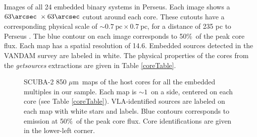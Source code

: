 \documentclass[usenatbib,a4paper]{mnras}
\newcommand{\um}{\mbox{$\mu$m}}%
\begin{document}
Images of all 24 embedded binary systems in Perseus.  Each image shows a $63\arcsec\ \times 63\arcsec$ cutout around each core.  These cutouts have a  corresponding physical scale of $\sim 0.7\ \mbox{pc} \times 0.7\ \mbox{pc}$, for a distance of 235 pc to Perseus \citep{Hirota08}.  The blue contour on each image corresponds to 50\%\ of the peak core flux.  Each map has a spatial resolution of 14.6\arcsec.  Embedded sources detected in the VANDAM survey \citep{Tobin16} are labeled in white.  The physical properties of the cores from the \emph{getsources} extractions are given in Table \ref{coreTable}.

\onecolumn

\renewcommand\thefigure{\thesection.\arabic{figure}}
\setcounter{figure}{0}

\begin{figure}
\centering
{}
\quad
{}
\quad
\caption{SCUBA-2 850 \um\ maps of the host cores for all the embedded multiples in our sample.  Each map is $\sim 1$\arcmin\ on a side, centered on each core (see Table \ref{coreTable}).  VLA-identified sources are labeled on each map with white stars and labels.  Blue contours corresponds to emission at 50\%\ of the peak core flux.  Core identifications are given in the lower-left corner. }
\label{fig:allfeature1}
\end{figure}
\begin{figure}
\centering
{}
\quad
{}
\quad
\contcaption{}
\label{fig:allfeature2}
\end{figure}
\begin{figure}
\centering
{}
\quad
{}
\quad
\contcaption{}
\label{fig:allfeature3}
\end{figure}
\end{document}
